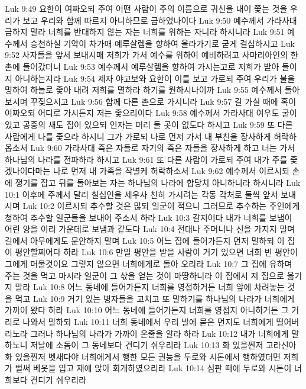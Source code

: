 Luk 9:49  요한이 여짜오되 주여 어떤 사람이 주의 이름으로 귀신을 내어 쫓는 것을 우리가 보고 우리와 함께 따르지 아니하므로 금하였나이다
Luk 9:50  예수께서 가라사대 금하지 말라 너희를 반대하지 않는 자는 너희를 위하는 자니라 하시니라
Luk 9:51  예수께서 승천하실 기약이 차가매 예루살렘을 향하여 올라가기로 굳게 결심하시고
Luk 9:52  사자들을 앞서 보내시매 저희가 가서 예수를 위하여 예비하려고 사마리아인의 한 촌에 들어갔더니
Luk 9:53  예수께서 예루살렘을 향하여 가시는고로 저희가 받아 들이지 아니하는지라
Luk 9:54  제자 야고보와 요한이 이를 보고 가로되 주여 우리가 불을 명하여 하늘로 좇아 내려 저희를 멸하라 하기를 원하시나이까
Luk 9:55  예수께서 돌아보시며 꾸짖으시고
Luk 9:56  함께 다른 촌으로 가시니라
Luk 9:57  길 가실 때에 혹이 여짜오되 어디로 가시든지 저는 좇으리이다
Luk 9:58  예수께서 가라사대 여우도 굴이 있고 공중의 새도 집이 있으되 인자는 머리 둘 곳이 없도다 하시고
Luk 9:59  또 다른 사람에게 나를 좇으라 하시니 그가 가로되 나로 먼저 가서 내 부친을 장사하게 허락하옵소서
Luk 9:60  가라사대 죽은 자들로 자기의 죽은 자들을 장사하게 하고 너는 가서 하나님의 나라를 전파하라 하시고
Luk 9:61  또 다른 사람이 가로되 주여 내가 주를 좇겠나이다마는 나로 먼저 내 가족을 작별케 허락하소서
Luk 9:62  예수께서 이르시되 손에 쟁기를 잡고 뒤를 돌아보는 자는 하나님의 나라에 합당치 아니하니라 하시니라
Luk 10:1  이후에 주께서 달리 칠십인을 세우사 친히 가시려는 각동 각처로 둘씩 앞서 보내시며
Luk 10:2  이르시되 추수할 것은 많되 일군이 적으니 그러므로 추수하는 주인에게 청하여 추수할 일군들을 보내어 주소서 하라
Luk 10:3  갈지어다 내가 너희를 보냄이 어린 양을 이리 가운데로 보냄과 같도다
Luk 10:4  전대나 주머니나 신을 가지지 말며 길에서 아무에게도 문안하지 말며
Luk 10:5  어느 집에 들어가든지 먼저 말하되 이 집이 평안할찌어다 하라
Luk 10:6  만일 평안을 받을 사람이 거기 있으면 너희 빈 평안이 그에게 머물것이요 그렇지 않으면 너희에게로 돌아 오리라
Luk 10:7  그 집에 유하며 주는 것을 먹고 마시라 일군이 그 삯을 얻는 것이 마땅하니라 이 집에서 저 집으로 옮기지 말라
Luk 10:8  어느 동네에 들어가든지 너희를 영접하거든 너희 앞에 차려놓는 것을 먹고
Luk 10:9  거기 있는 병자들을 고치고 또 말하기를 하나님의 나라가 너희에게 가까이 왔다 하라
Luk 10:10  어느 동네에 들어가든지 너희를 영접지 아니하거든 그 거리로 나와서 말하되
Luk 10:11  너희 동네에서 우리 발에 묻은 먼지도 너희에게 떨어버리노라 그러나 하나님의 나라가 가까이 온줄을 알라 하라
Luk 10:12  내가 너희에게 말하노니 저날에 소돔이 그 동네보다 견디기 쉬우리라
Luk 10:13  화 있을찐저 고라신아 화 있을찐저 벳새다야 너희에게서 행한 모든 권능을 두로와 시돈에서 행하였더면 저희가 벌써 베옷을 입고 재에 앉아 회개하였으리라
Luk 10:14  심판 때에 두로와 시돈이 너희보다 견디기 쉬우리라
